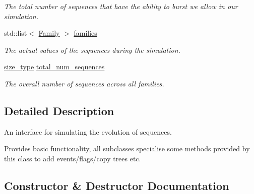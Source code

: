 \begin{DoxyCompactItemize}
\begin{DoxyCompactList}\small\item\em The total number of sequences that have the ability to burst we allow in our simulation. \end{DoxyCompactList}\item 
std\+::list$<$ \hyperlink{classretrocombinator_1_1Family}{Family} $>$ \hyperlink{classretrocombinator_1_1Evolution_a163715452c511724ecc0ef16a5030dea}{families}
\begin{DoxyCompactList}\small\item\em The actual values of the sequences during the simulation. \end{DoxyCompactList}\item 
\mbox{\label{classretrocombinator_1_1Evolution_abc218e27bae28eb73089e56cc8b51b4e}} 
\hyperlink{namespaceretrocombinator_a8e1541b50cee66a791df4c437ccbb385}{size\+\_\+type} \hyperlink{classretrocombinator_1_1Evolution_abc218e27bae28eb73089e56cc8b51b4e}{total\+\_\+num\+\_\+sequences}
\begin{DoxyCompactList}\small\item\em The overall number of sequences across all families. \end{DoxyCompactList}\end{DoxyCompactItemize}


\subsection{Detailed Description}
An interface for simulating the evolution of sequences. 

Provides basic functionality, all subclasses specialise some methods provided by this class to add events/flags/copy trees etc. 

\subsection{Constructor \& Destructor Documentation}
\mbox{\label{classretrocombinator_1_1Evolution_a0aa94cf8dd5f6184535faf82842337fd}} 
